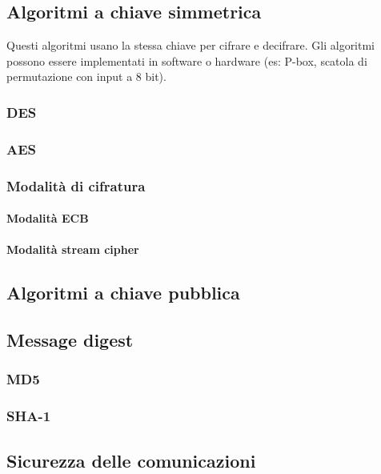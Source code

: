 \subsection{Algoritmi a chiave simmetrica} %
Questi algoritmi usano la stessa chiave per cifrare e decifrare.
Gli algoritmi possono essere implementati in software o hardware (es: P-box, scatola di permutazione con input a 8 bit).

\subsubsection{DES}

\subsubsection{AES}

\subsubsection{Modalità di cifratura}

\paragraph{Modalità ECB}

\paragraph{Modalità stream cipher}

\subsection{Algoritmi a chiave pubblica} %

\subsection{Message digest} %

\subsubsection{MD5}

\subsubsection{SHA-1}

\subsection{Sicurezza delle comunicazioni} %

